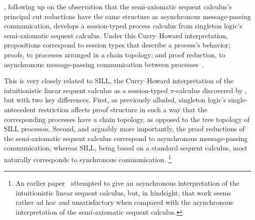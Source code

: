 






, following up on the observation that the semi-axiomatic sequent calculus's principal cut reductions have the same structure as asynchronous message-passing communication, develops a session-typed process calculus from singleton logic's semi-axiomatic sequent calculus.
Under this Curry--Howard interpretation, propositions correspond to session types that describe a process's behavior; proofs, to processes arranged in a chain topology; and proof reduction, to asynchronous message-passing communication between processes~.

This is very closely related to SILL, the Curry--Howard interpretation of the intuitionistic linear sequent calculus as a session-typed $\pi$-calculus discovered by \citeauthor{Caires+:MSCS16}\autocites{Caires+Pfenning:CONCUR10}{Caires+:TLDI12}{Caires+:MSCS16}, but with two key differences.
First, as previously alluded, singleton logic's single-antecedent restriction affects proof structure in such a way that the corresponding processes have a chain topology, as opposed to the tree topology of SILL processes.
Second, and arguably more importantly, the proof reductions of the semi-axiomatic sequent calculus correspond to asynchronous message-passing communication, whereas SILL, being based on a standard sequent calculus, most naturally corresponds to synchronous communication.%
\footnote{An earlier paper~\parencite{DeYoung+:CSL12} attempted to give an asynchronous interpretation of the intuitionistic linear sequent calculus, but, in hindsight, that work seems rather ad hoc and unsatisfactory when compared with the asynchronous interpretation of the semi-axiomatic sequent calculus.}

